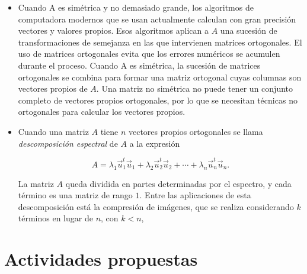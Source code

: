 {\begin{remark}
\begin{itemize}
\bigskip

$ f$ es unitaria (ortogonal) $\longleftrightarrow$  $(f)_B$ es unitaria (ortogonal) 

\bigskip

\item

Cuando A es simétrica y no demasiado grande, los algoritmos de computadora modernos que se usan  actualmente calculan con gran precisión vectores y valores propios.
Esos algoritmos aplican a $A$ una sucesión de transformaciones de semejanza en las
que intervienen matrices ortogonales.  El uso de matrices ortogonales evita que
los errores numéricos se acumulen durante el proceso. Cuando A es simétrica, la
sucesión de matrices ortogonales se combina para formar una matriz ortogonal cuyas
columnas son vectores propios de $A$.
Una matriz no simétrica no puede tener un conjunto completo de vectores propios
ortogonales, por lo que se necesitan técnicas no ortogonales para calcular los vectores
propios.


\bigskip

\item
Cuando una matriz $A$ tiene $n$ vectores propios ortogonales se llama \textit{descomposición espectral} de $A$ a la expresión

$$A= \lambda_1 \vec{u}_1^t \vec{u}_1 +\lambda_2 \vec{u}_2^t \vec{u}_2 + \cdots +\lambda_n \vec{u}_n^t \vec{u}_n.$$

La matriz $A$ queda dividida en partes determinadas por el espectro, y cada término es una matriz de rango $1$. Entre las aplicaciones de esta descomposición está la compresión de imágenes, que se realiza considerando  $k$ términos en lugar de $n$, con $k <n $, 
\end{itemize}
\end{remark} 

\bigskip
%
%

\newpage




\section{Actividades propuestas}
\begin{answers}


\end{answers}}
